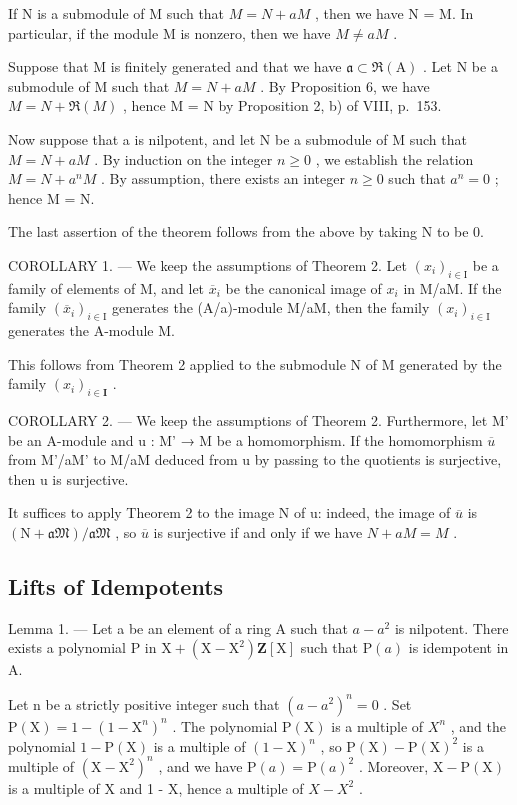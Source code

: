 If N is a submodule of M such that \(M = N + aM\) , then we have N = M. In particular, if the module M is nonzero, then we have \(M \neq aM\) .

Suppose that M is finitely generated and that we have \(\mathfrak{a} \subset \Re(\mathrm{A})\) . Let N be a submodule of M such that \(M = N + aM\) . By Proposition 6, we have \(M = N + \Re(M)\) , hence M = N by Proposition 2, b) of VIII, p.~153.

Now suppose that a is nilpotent, and let N be a submodule of M such that \(M = N + aM\) . By induction on the integer \(n \geqslant 0\) , we establish the relation \(M = N + a^{n}M\) . By assumption, there exists an integer \(n \geqslant 0\) such that \(a^{n} = 0\) ; hence M = N.

The last assertion of the theorem follows from the above by taking N to be 0.

COROLLARY 1. --- We keep the assumptions of Theorem 2. Let \((x_{i})_{i\in\mathrm{I}}\) be a family of elements of M, and let \(\overline{x}_{i}\) be the canonical image of \(x_{i}\) in M/aM. If the family \((\overline{x}_{i})_{i\in\mathrm{I}}\) generates the (A/a)-module M/aM, then the family \((x_{i})_{i\in\mathrm{I}}\) generates the A-module M.

This follows from Theorem 2 applied to the submodule N of M generated by the family \((x_{i})_{i\in \mathbf{I}}\) .

COROLLARY 2. --- We keep the assumptions of Theorem 2. Furthermore, let M' be an A-module and u : M' → M be a homomorphism. If the homomorphism \(\overline{u}\) from M'/aM' to M/aM deduced from u by passing to the quotients is surjective, then u is surjective.

It suffices to apply Theorem 2 to the image N of u: indeed, the image of \(\overline{u}\) is \((\mathrm{N} + \mathfrak{aM})/\mathfrak{aM}\) , so \(\overline{u}\) is surjective if and only if we have \(N + aM = M\) .

\subsection{Lifts of Idempotents}

Lemma 1. --- Let a be an element of a ring A such that \(a - a^{2}\) is nilpotent. There exists a polynomial P in \(\mathrm{X} + (\mathrm{X} - \mathrm{X}^{2})\mathbf{Z}[\mathrm{X}]\) such that \(\mathrm{P}(a)\) is idempotent in A.

Let n be a strictly positive integer such that \((a - a^{2})^{n} = 0\) . Set \(\mathrm{P}(\mathrm{X}) = 1 - (1 - \mathrm{X}^{n})^{n}\) . The polynomial \(\mathrm{P}(\mathrm{X})\) is a multiple of \(X^{n}\) , and the polynomial \(1 - \mathrm{P}(\mathrm{X})\) is a multiple of \((1 - \mathrm{X})^{n}\) , so \(\mathrm{P}(\mathrm{X}) - \mathrm{P}(\mathrm{X})^{2}\) is a multiple of \((\mathrm{X} - \mathrm{X}^{2})^{n}\) , and we have \(\mathrm{P}(a) = \mathrm{P}(a)^{2}\) . Moreover, \(\mathrm{X} - \mathrm{P}(\mathrm{X})\) is a multiple of X and 1 - X, hence a multiple of \(X - X^{2}\) .

